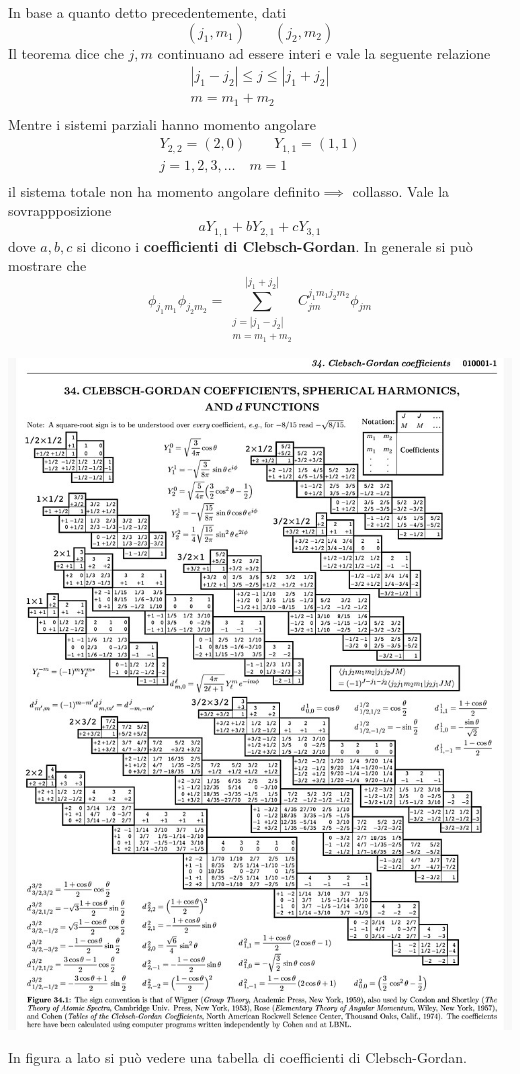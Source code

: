 In base a quanto detto precedentemente, dati \[
                                                 (j_{1},m_{1}) \qquad (j_{2},m_{2})
\] Il teorema dice che \(j,m\) continuano ad essere interi e vale la
seguente relazione \begin{gather*}
    | j_{1} - j_{2}| \leq j \leq | j_{1} + j_{2} |\\
    m = m_{1} + m_{2}\\
\end{gather*} Mentre i sistemi parziali hanno momento angolare \begin{gather*}
    Y_{2,2}=(2,0) \qquad Y_{1,1}=(1,1)\\
    j = 1,2,3, \dots \quad m = 1\\
\end{gather*} il sistema totale non ha momento angolare definito\(\implies\)
collasso.
Vale la sovrappposizione \[
                                       a Y_{1,1}+bY_{2,1}+cY_{3,1}
\] dove \(a,b,c\) si dicono i \textbf{coefficienti di Clebsch-Gordan}.
In generale si può mostrare che \[
                                    \phi_{j_{1}m_{1}} \phi_{j_{2}m_{2}} = \sum_{\substack{j=| j_{1}-j_{2}| \\ m = m_{1}+m_{2}} }^{| j_{1}+j_{2}|} C_{jm}^{j_{1}m_{1}j_{2}m_{2}} \phi_{jm}
\]
\begin{marginfigure}
    \includegraphics{figs/cl-gord}
    \label{fig:cl-gord}
\end{marginfigure}
In figura a lato si può vedere una tabella di coefficienti di
Clebsch-Gordan.

